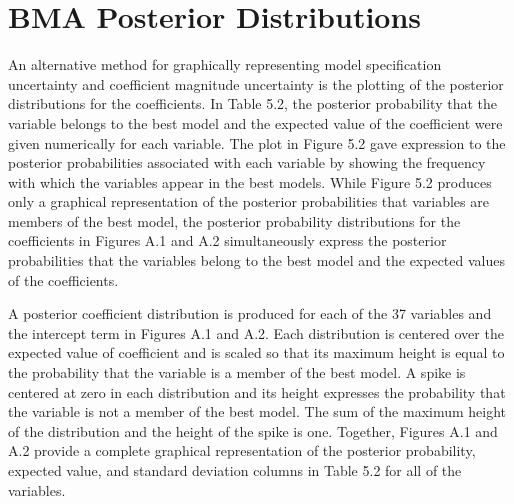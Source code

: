\chapter{BMA Posterior Distributions}\label{appendix1}
\fixchapterheading

\vspace{0.8cm}

An alternative method for graphically representing model specification uncertainty and coefficient magnitude uncertainty is the plotting of the posterior distributions for the coefficients.  In Table 5.2, the posterior probability that the variable belongs to the best model and the expected value of the coefficient were given numerically for each variable.  The plot in Figure 5.2 gave expression to the posterior probabilities associated with each variable by showing the frequency with which the variables appear in the best models.  While Figure 5.2 produces only a graphical representation of the posterior probabilities that variables are members of the best model, the posterior probability distributions for the coefficients in Figures A.1 and A.2 simultaneously express the posterior probabilities that the variables belong to the best model and the expected values of the coefficients.

A posterior coefficient distribution is produced for each of the 37 variables and the intercept term in Figures A.1 and A.2.  Each distribution is centered over the expected value of coefficient and is scaled so that its maximum height is equal to the probability that the variable is a member of the best model.   A spike is centered at zero in each distribution and its height expresses the probability that the variable is not a member of the best model.  The sum of the maximum height of the distribution and the height of the spike is one.  Together, Figures A.1 and A.2 provide a complete graphical representation of the posterior probability, expected value, and standard deviation columns in Table 5.2 for all of the variables.


